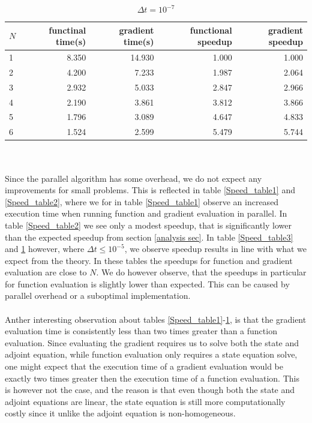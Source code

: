 \begin{table}[!h]
\centering
\caption{$\Delta t=10^{-7}$}
\label{speed_table_end}
\begin{tabular}{lrrrr}
\toprule
{}$N$ &  functinal time(s) &  gradient time(s) &  functional speedup &  gradient speedup \\
\midrule
1 &           8.350 &         14.930 &            1.000 &          1.000 \\
2 &           4.200 &          7.233 &            1.987 &          2.064 \\
3 &           2.932 &          5.033 &            2.847 &          2.966 \\
4 &           2.190 &          3.861 &            3.812 &          3.866 \\
5 &           1.796 &          3.089 &            4.647 &          4.833 \\
6 &           1.524 &          2.599 &            5.479 &          5.744 \\
\bottomrule
\end{tabular}
\end{table}
\\
\\
Since the parallel algorithm has some overhead, we do not expect any improvements for small problems. This is reflected in table \ref{Speed_table1} and \ref{Speed_table2}, where we for in table \ref{Speed_table1} observe an increased execution time when running function and gradient evaluation in parallel. In table \ref{Speed_table2} we see only a modest speedup, that is significantly lower than the expected speedup from section \ref{analysis sec}. In table \ref{Speed_table3} and \ref{speed_table_end} however, where $\Delta t \leq 10^{-5}$, we observe speedup results in line with what we expect from the theory. In these tables the speedups for function and gradient evaluation are close to $N$. We do however observe, that the speedups in particular for function evaluation is slightly lower than expected. This can be caused by parallel overhead or a suboptimal implementation. 
\\
\\
Anther interesting observation about tables \ref{Speed_table1}-\ref{speed_table_end}, is that the gradient evaluation time is consistently less than two times greater than a function evaluation. Since evaluating the gradient requires us to solve both the state and adjoint equation, while function evaluation only requires a state equation solve, one might expect that the execution time of a gradient evaluation would be exactly two times greater then the execution time of a function evaluation. This is however not the case, and the reason is that even though both the state and adjoint equations are linear, the state equation is still more computationally costly since it unlike the adjoint equation is non-homogeneous.
